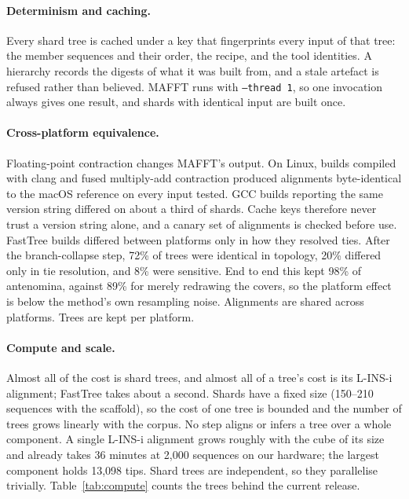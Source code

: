 \documentclass[11pt,a4paper]{article}
\begin{document}
\paragraph{Determinism and caching.}
Every shard tree is cached under a key that fingerprints every input of that tree: the member
sequences and their order, the recipe, and the tool identities. A hierarchy records the digests of
what it was built from, and a stale artefact is refused rather than believed. MAFFT runs with
\texttt{--thread 1}, so one invocation always gives one result, and shards with identical input are
built once.

\paragraph{Cross-platform equivalence.}
Floating-point contraction changes MAFFT's output. On Linux, builds compiled with clang and fused
multiply-add contraction produced alignments byte-identical to the macOS reference on every input
tested. GCC builds reporting the same version string differed on about a third of shards. Cache
keys therefore never trust a version string alone, and a canary set of alignments is checked before
use. FastTree builds differed between platforms only in how they resolved ties. After the
branch-collapse step, 72\% of trees were identical in topology, 20\% differed only in
tie resolution, and 8\% were sensitive. End to end this kept 98\% of antenomina, against 89\% for
merely redrawing the covers, so the platform effect is below the method's own resampling noise.
Alignments are shared across platforms. Trees are kept per platform.

\paragraph{Compute and scale.}
Almost all of the cost is shard trees, and almost all of a tree's cost is its L-INS-i alignment;
FastTree takes about a second. Shards have a fixed size (150--210 sequences with the scaffold), so
the cost of one tree is bounded and the number of trees grows linearly with the corpus. No step
aligns or infers a tree over a whole component. A single L-INS-i alignment grows roughly with the
cube of its size and already takes 36 minutes at 2{,}000 sequences on our hardware; the largest
component holds 13{,}098 tips. Shard trees are independent, so they parallelise trivially.
Table~\ref{tab:compute} counts the trees behind the current release.
\end{document}
